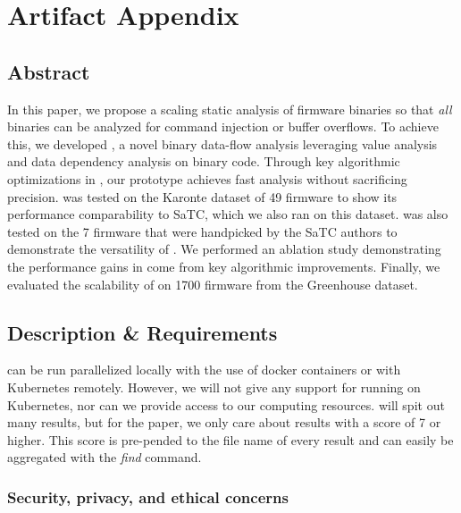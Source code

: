 
\appendix
\section{Artifact Appendix}

\subsection{Abstract}
In this paper, we propose a scaling static analysis of firmware binaries so that \emph{all} binaries can be analyzed for command injection or buffer overflows.
To achieve this, we developed \rda, a novel binary data-flow analysis leveraging value analysis and data dependency analysis on binary code.
Through key algorithmic optimizations in \rda, our prototype \mango achieves fast analysis without sacrificing precision.
\mango was tested on the Karonte dataset of 49 firmware to show its performance comparability to SaTC, which we also ran on this dataset.
\mango was also tested on the 7 firmware that were handpicked by the SaTC authors to demonstrate the versatility of \mango.
We performed an ablation study demonstrating the performance gains in \mango come from key algorithmic improvements.
Finally, we evaluated the scalability of \mango on 1700 firmware from the Greenhouse dataset.

\subsection{Description \& Requirements}

\mango can be run parallelized locally with the use of docker containers or with Kubernetes remotely.
However, we will not give any support for running on Kubernetes, nor can we provide access to our computing resources.
\mango will spit out many results, but for the paper, we only care about results with a score of 7 or higher.
This score is pre-pended to the file name of every result and can easily be aggregated with the \emph{find} command.


\subsubsection{Security, privacy, and ethical concerns}


